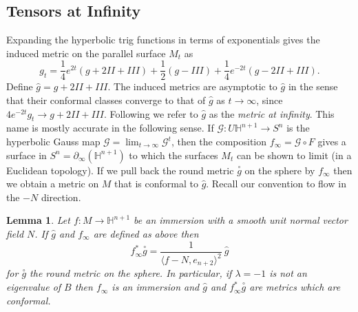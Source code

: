\documentclass{amsart}
\newcommand{\two}{I\!\!I}
\newcommand{\three}{I\!\!I\!\!I}
\newtheorem{lem}[thm]{Lemma}
\renewcommand{\H}{\mathbb{H}}
\begin{document}
\subsection{Tensors at Infinity}

Expanding the hyperbolic trig functions in terms of exponentials gives the induced metric on the parallel surface $M_t$ as 
\[
g_t = \frac{1}{4}e^{2t}(g + 2\two + \three) + \frac{1}{2}(g - \three) + \frac{1}{4}e^{-2t}(g - 2\two + \three).
\]
Define $\hat{g} = g + 2\two + \three$.
The induced metrics are asymptotic to $\hat{g}$ in the sense that their conformal classes converge to that of $\hat{g}$ as $t \to \infty$, since $4e^{-2t}g_t \to g + 2\two + \three$.
Following \cite{Krasnov-Schlenker2008} we refer to $\hat{g}$ as the \emph{metric at infinity}.
This name is mostly accurate in the following sense. 
If $\mathcal{G}: U\H^{n+1} \to S^n$ is the hyperbolic Gauss map $\mathcal{G} = \lim_{t \to \infty} \mathcal{G}^t$, then the composition $f_\infty = \mathcal{G} \circ F$ gives a
surface in $S^n = \partial_\infty(\H^{n+1})$ to which the surfaces $M_t$ can be shown to limit (in a Euclidean topology). 
If we pull back the round metric $\overset{\circ}{g}$ on the sphere by $f_\infty$ then we obtain a metric on $M$ that is conformal to $\hat{g}$.
Recall our convention to flow in the $-N$ direction.

\begin{lem}
\label{HypGaussMap}
Let $f: M \to \H^{n+1}$ be an immersion with a smooth unit normal vector field $N$. If $\hat{g}$ and $f_\infty$ are defined as above then 
\[
f^*_\infty \overset{\circ}{g} = \frac{1}{\langle f - N, e_{n+2}\rangle^2} \ \hat{g}
\]
for $\overset{\circ}{g}$ the round metric on the sphere.
In particular, if $\lambda =-1$ is not an eigenvalue of $B$ then $f_\infty$ is an immersion and $\hat{g}$ and $f_\infty^*\overset{\circ}{g}$ are metrics which are conformal.
\end{lem}
\end{document}
